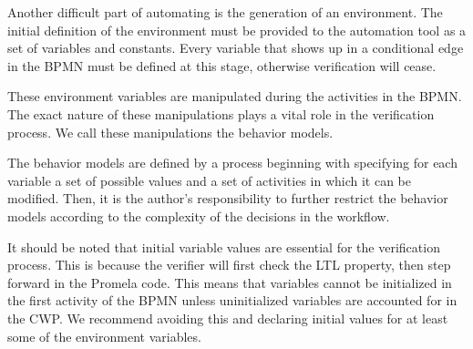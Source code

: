 Another difficult part of automating is the generation of an environment. The initial definition of the environment must be provided to the automation tool as a set of variables and constants. Every variable that shows up in a conditional edge in the BPMN must be defined at this stage, otherwise verification will cease.

These environment variables are manipulated during the activities in the BPMN. The exact nature of these manipulations plays a vital role in the verification process. We call these manipulations the behavior models.

The behavior models are defined by a process beginning with specifying for each variable a set of possible values and a set of activities in which it can be modified. Then, it is the author's responsibility to further restrict the behavior models according to the complexity of the decisions in the workflow.

It should be noted that initial variable values are essential for the verification process. This is because the verifier will first check the LTL property, then step forward in the Promela code. This means that variables cannot be initialized in the first activity of the BPMN unless uninitialized variables are accounted for in the CWP. We recommend avoiding this and declaring initial values for at least some of the environment variables.

